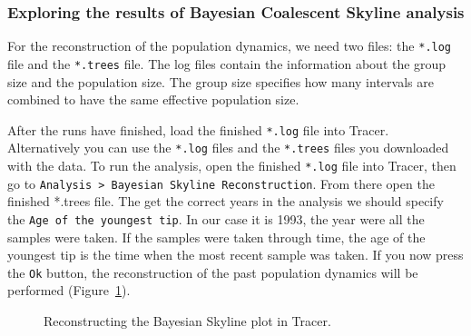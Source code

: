 \documentclass[11pt]{article}
\begin{document}
\subsubsection{Exploring the results of Bayesian Coalescent Skyline analysis}


For the reconstruction of the population dynamics, we need two files: the \texttt{*.log} file and the \texttt{*.trees} file. The log files contain the information about the group size and the population size. The group size specifies how many intervals are combined to have the same effective population size. 

After the runs have finished, load the finished \texttt{*.log} file into Tracer. Alternatively you can use the \texttt{*.log} files and the \texttt{*.trees} files you downloaded with the data. To run the analysis, open the finished \texttt{*.log} file into Tracer, then go to \texttt{Analysis > Bayesian Skyline Reconstruction}. From there open the finished *.trees file. The get the correct years in the analysis we should specify the \texttt{Age of the youngest tip}. In our case it is 1993, the year were all the samples were taken. If the samples were taken through time, the age of the youngest tip is the time when the most recent sample was taken. If you now press the \texttt{Ok} button, the reconstruction of the past population dynamics will be performed (Figure~\ref{fig:trees}).

\begin{figure}[h!]
\centering
{}
\caption{\small Reconstructing the Bayesian Skyline plot in Tracer.}
\label{fig:trees}
\end{figure}
\end{document}
